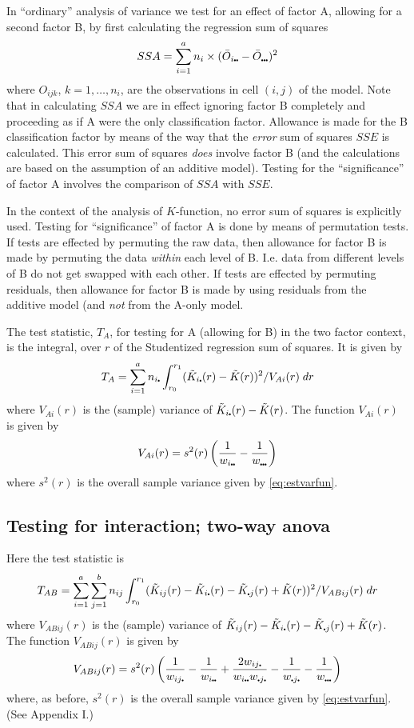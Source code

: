 \documentclass[12pt]{article}
\newcommand{\pullet}{\mbox{\scalebox{0.4}{$\bullet$}}}
\begin{document}
In ``ordinary'' analysis of variance we test for an effect of
factor A, allowing for a second factor B, by first calculating the
regression sum of squares
\[
SSA = \sum_{i=1}^a n_i \times (\bar{O}_{i \pullet \pullet} -
                                     \bar{O}_{\pullet \pullet \pullet})^2
\]
where $O_{ijk}$, $k = 1, \ldots, n_i$, are the observations in
cell $(i,j)$ of the model.   Note that in calculating $SSA$ we
are in effect ignoring factor B completely and proceeding as if A
were the only classification factor.  Allowance is made for the B
classification factor by means of the way that the \emph{error}
sum of squares $SSE$ is calculated.  This error sum of squares
\emph{does} involve factor B (and the calculations are based on the
assumption of an additive model).  Testing for the ``significance''
of factor A involves the comparison of $SSA$ with $SSE$.

In the context of the analysis of $K$-function, no error sum of
squares is explicitly used.  Testing for ``significance'' of factor
A is done by means of permutation tests.  If tests are effected
by permuting the raw data, then allowance for factor B is made by
permuting the data \emph{within} each level of B.  I.e. data from
different levels of B do not get swapped with each other.  If tests
are effected by permuting residuals, then allowance for factor B
is made by using residuals from the additive model (and \emph{not}
from the A-only model.

The test statistic, $T_A$, for testing for A (allowing for B) in
the two factor context, is the integral, over $r$ of the Studentized
regression sum of squares.  It is given by
\[
T_A = \sum_{i=1}^a n_{i \pullet} \int_{r_0}^{r_1} (\tilde{K}_{i \pullet}(r) -
                 \tilde{K}(r))^2/V_{Ai}(r) \; dr
\]
where $V_{Ai}(r)$ is the (sample) variance of $\tilde{K}_{i \pullet}(r) - \tilde{K}(r)$.
The function $V_{Ai}(r)$ is given by
\[
V_{Ai}(r) = s^2(r) \left ( \frac{1}{w_{i \pullet \pullet}} -
                           \frac{1}{w_{\pullet \pullet \pullet}} \right )
\]
where $s^2(r)$ is the overall sample variance given by \eqref{eq:estvarfun}.

\subsection{Testing for interaction; two-way anova}
\label{sec:interac}
Here the test statistic is
\[
T_{AB}= \sum_{i=1}^a \sum_{j=1}^b n_{ij} \int_{r_0}^{r_1} (\tilde{K}_{ij}(r) -
   \tilde{K}_{i\pullet}(r) - \tilde{K}_{\pullet j}(r) +
   \tilde{K}(r))^2/V_{ABij}(r) \; dr
\]
where $V_{ABij}(r)$ is the (sample) variance of $\tilde{K}_{ij}(r)
- \tilde{K}_{i\pullet}(r) - \tilde{K}_{\pullet j}(r) + \tilde{K}(r)$.
The function $V_{ABij}(r)$ is given by
\begin{equation}
\label{eq:varSSR}
V_{ABij}(r) = s^2(r) \left ( \frac{1}{w_{i j \pullet}} - \frac{1}{w_{i \pullet \pullet}} +
\frac{2 w_{i j \pullet}}{w_{i \pullet \pullet} w_{\pullet j \pullet}}
- \frac{1}{w_{\pullet j \pullet}} - \frac{1}{w_{\pullet \pullet \pullet}}
\right )
\end{equation}
where, as before, $s^2(r)$ is the overall sample variance
given by \eqref{eq:estvarfun}.  (See Appendix I.)
\end{document}
